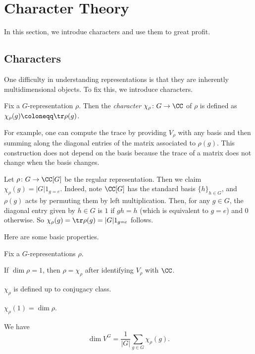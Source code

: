 \documentclass{article}
\begin{document}
\section{Character Theory}
In this section, we introdue characters and use them to great profit.

\subsection{Characters}
One difficulty in understanding representations is that they are inherently multidimensional objects. To fix this, we introduce characters.
\begin{definition}[character]
	Fix a $G$-representation $\rho$. Then the \textit{character} $\chi_\rho\colon G\to\CC$ of $\rho$ is defined as $\chi_\rho(g)\coloneqq\tr\rho(g)$.
\end{definition}
For example, one can compute the trace by providing $V_\rho$ with any basis and then summing along the diagonal entries of the matrix associated to $\rho(g)$. This construction does not depend on the basis because the trace of a matrix does not change when the basis changes.
\begin{example} \label{ex:regular-character}
	Let $\rho\colon G\to\CC[G]$ be the regular representation. Then we claim $\chi_\rho(g)=|G|1_{g=e}$. Indeed, note $\CC[G]$ has the standard basis $\{h\}_{h\in G}$, and $\rho(g)$ acts by permuting them by left multiplication. Then, for any $g\in G$, the diagonal entry given by $h\in G$ is $1$ if $gh=h$ (which is equivalent to $g=e$) and $0$ otherwise. So $\chi_\rho(g)=\tr\rho(g)=|G|1_{g=e}$ follows.
\end{example}
Here are some basic properties.
\begin{lemma} \label{lem:char-comps}
	Fix a $G$-representations $\rho$.
	\begin{listalph}
		\item If $\dim\rho=1$, then $\rho=\chi_\rho$ after identifying $V_\rho$ with $\CC$.
		\item $\chi_\rho$ is defined up to conjugacy class.
		\item $\chi_\rho(1)=\dim\rho$.
		\item We have
		\[\dim V^G=\frac1{|G|}\sum_{g\in G}\chi_\rho(g).\]
	\end{listalph}
\end{lemma}
\end{document}
